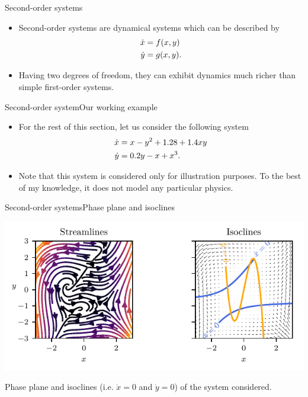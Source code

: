 \documentclass[usenames,dvipsnames,svgnames,10pt,aspectratio=169]{beamer}
\begin{document}
\begin{frame}[t, c]{Second-order systems}{}
	\begin{itemize}
		\item Second-order systems are dynamical systems which can be described by
		\begin{equation}
			\begin{aligned}
				\dot{x} & = f(x, y) \\
				\dot{y} & = g(x, y).
			\end{aligned}
			\notag
		\end{equation}

		\bigskip

		\item Having two degrees of freedom, they can exhibit dynamics much richer than simple first-order systems.
	\end{itemize}

	\vspace{1cm}
\end{frame}

\begin{frame}[t, c]{Second-order system}{Our working example}
	\begin{itemize}
		\item For the rest of this section, let us consider the following system
		\begin{equation}
			\begin{aligned}
				\dot{x} & = x - y^2 + 1.28 + 1.4 xy \\
				\dot{y} & = 0.2 y - x + x^3.
			\end{aligned}
			\notag
		\end{equation}

		\bigskip

		\item Note that this system is considered only for illustration purposes. To the best of my knowledge, it does not model any particular physics.
	\end{itemize}

	\vspace{1cm}
\end{frame}

\begin{frame}[t, c]{Second-order systems}{Phase plane and isoclines}
	\centering

	\includegraphics[width=.75\textwidth]{phase_plane_and_isoclines}

	Phase plane and isoclines (i.e. $\dot{x} = 0$ and $\dot{y} = 0$) of the system considered.

	\vspace{1cm}
\end{frame}
\end{document}
